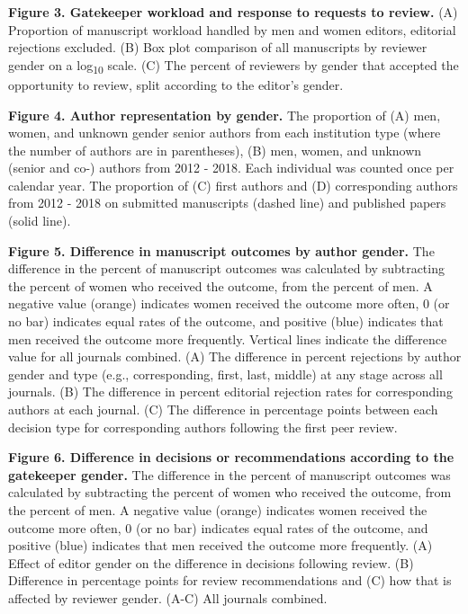 \documentclass[11pt,]{article}
\begin{document}
\textbf{Figure 3. Gatekeeper workload and response to requests to
review.} (A) Proportion of manuscript workload handled by men and women
editors, editorial rejections excluded. (B) Box plot comparison of all
manuscripts by reviewer gender on a log\textsubscript{10} scale. (C) The
percent of reviewers by gender that accepted the opportunity to review,
split according to the editor's gender.

\textbf{Figure 4. Author representation by gender.} The proportion of
(A) men, women, and unknown gender senior authors from each institution
type (where the number of authors are in parentheses), (B) men, women,
and unknown (senior and co-) authors from 2012 - 2018. Each individual
was counted once per calendar year. The proportion of (C) first authors
and (D) corresponding authors from 2012 - 2018 on submitted manuscripts
(dashed line) and published papers (solid line).

\textbf{Figure 5. Difference in manuscript outcomes by author gender.}
The difference in the percent of manuscript outcomes was calculated by
subtracting the percent of women who received the outcome, from the
percent of men. A negative value (orange) indicates women received the
outcome more often, 0 (or no bar) indicates equal rates of the outcome,
and positive (blue) indicates that men received the outcome more
frequently. Vertical lines indicate the difference value for all
journals combined. (A) The difference in percent rejections by author
gender and type (e.g., corresponding, first, last, middle) at any stage
across all journals. (B) The difference in percent editorial rejection
rates for corresponding authors at each journal. (C) The difference in
percentage points between each decision type for corresponding authors
following the first peer review.

\textbf{Figure 6. Difference in decisions or recommendations according
to the gatekeeper gender.} The difference in the percent of manuscript
outcomes was calculated by subtracting the percent of women who received
the outcome, from the percent of men. A negative value (orange)
indicates women received the outcome more often, 0 (or no bar) indicates
equal rates of the outcome, and positive (blue) indicates that men
received the outcome more frequently. (A) Effect of editor gender on the
difference in decisions following review. (B) Difference in percentage
points for review recommendations and (C) how that is affected by
reviewer gender. (A-C) All journals combined.
\end{document}
